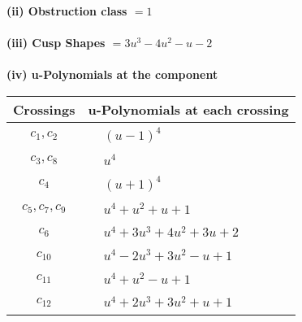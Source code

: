 \documentclass[1p]{elsarticle_modified}
\theoremstyle{definition}
\begin{document}
\flushleft \textbf{(ii) Obstruction class $= 1$}\\~\\
\flushleft \textbf{(iii) Cusp Shapes $= 3 u^3-4 u^2- u-2$}\\~\\
\newpage\renewcommand{\arraystretch}{1}
\flushleft \textbf{(iv) u-Polynomials at the component}\newline \\
\begin{tabular}{m{50pt}|m{274pt}}
Crossings & \hspace{64pt}u-Polynomials at each crossing \\
\hline $$\begin{aligned}c_{1},c_{2}\end{aligned}$$&$\begin{aligned}
&(u-1)^4
\end{aligned}$\\
\hline $$\begin{aligned}c_{3},c_{8}\end{aligned}$$&$\begin{aligned}
&u^4
\end{aligned}$\\
\hline $$\begin{aligned}c_{4}\end{aligned}$$&$\begin{aligned}
&(u+1)^4
\end{aligned}$\\
\hline $$\begin{aligned}c_{5},c_{7},c_{9}\end{aligned}$$&$\begin{aligned}
&u^4+u^2+u+1
\end{aligned}$\\
\hline $$\begin{aligned}c_{6}\end{aligned}$$&$\begin{aligned}
&u^4+3 u^3+4 u^2+3 u+2
\end{aligned}$\\
\hline $$\begin{aligned}c_{10}\end{aligned}$$&$\begin{aligned}
&u^4-2 u^3+3 u^2- u+1
\end{aligned}$\\
\hline $$\begin{aligned}c_{11}\end{aligned}$$&$\begin{aligned}
&u^4+u^2- u+1
\end{aligned}$\\
\hline $$\begin{aligned}c_{12}\end{aligned}$$&$\begin{aligned}
&u^4+2 u^3+3 u^2+u+1
\end{aligned}$\\
\hline
\end{tabular}\\~\\
\end{document}

